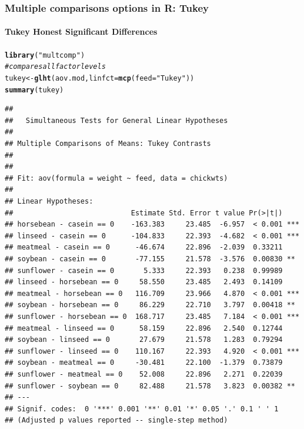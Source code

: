 \documentclass{beamer}\usepackage[]{graphicx}\usepackage[]{color}
\makeatletter
\newcommand{\hlstr}[1]{\textcolor[rgb]{0.192,0.494,0.8}{#1}}%
\newcommand{\hlcom}[1]{\textcolor[rgb]{0.678,0.584,0.686}{\textit{#1}}}%
\newcommand{\hlstd}[1]{\textcolor[rgb]{0.345,0.345,0.345}{#1}}%
\newcommand{\hlkwb}[1]{\textcolor[rgb]{0.69,0.353,0.396}{#1}}%
\newcommand{\hlkwc}[1]{\textcolor[rgb]{0.333,0.667,0.333}{#1}}%
\newcommand{\hlkwd}[1]{\textcolor[rgb]{0.737,0.353,0.396}{\textbf{#1}}}%
\newenvironment{kframe}{%
 \def\at@end@of@kframe{}%
 \ifinner\ifhmode%
  \def\at@end@of@kframe{\end{minipage}}%
  \begin{minipage}{\columnwidth}%
 \fi\fi%
 \def\FrameCommand##1{\hskip\@totalleftmargin \hskip-\fboxsep
 \colorbox{shadecolor}{##1}\hskip-\fboxsep
     \hskip-\linewidth \hskip-\@totalleftmargin \hskip\columnwidth}%
 \MakeFramed {\advance\hsize-\width
   \@totalleftmargin\z@ \linewidth\hsize
   \@setminipage}}%
 {\par\unskip\endMakeFramed%
 \at@end@of@kframe}
\newenvironment{knitrout}{}{} %
\makeatother
\begin{document}
{{{
\begin{frame}[fragile]
\frametitle{Multiple comparisons options in R: Tukey}
\framesubtitle{Tukey Honest Significant Differences}
\begin{knitrout}\tiny
{}\color{fgcolor}\begin{kframe}
\begin{alltt}
\hlkwd{library}\hlstd{(}\hlstr{"multcomp"}\hlstd{)}
\hlcom{# compares all factor levels}
\hlstd{tukey} \hlkwb{<-} \hlkwd{glht}\hlstd{(aov.mod,} \hlkwc{linfct} \hlstd{=} \hlkwd{mcp}\hlstd{(}\hlkwc{feed} \hlstd{=} \hlstr{"Tukey"}\hlstd{))}
\hlkwd{summary}\hlstd{(tukey)}
\end{alltt}
\begin{verbatim}
## 
## 	 Simultaneous Tests for General Linear Hypotheses
## 
## Multiple Comparisons of Means: Tukey Contrasts
## 
## 
## Fit: aov(formula = weight ~ feed, data = chickwts)
## 
## Linear Hypotheses:
##                            Estimate Std. Error t value Pr(>|t|)    
## horsebean - casein == 0    -163.383     23.485  -6.957  < 0.001 ***
## linseed - casein == 0      -104.833     22.393  -4.682  < 0.001 ***
## meatmeal - casein == 0      -46.674     22.896  -2.039  0.33211    
## soybean - casein == 0       -77.155     21.578  -3.576  0.00830 ** 
## sunflower - casein == 0       5.333     22.393   0.238  0.99989    
## linseed - horsebean == 0     58.550     23.485   2.493  0.14109    
## meatmeal - horsebean == 0   116.709     23.966   4.870  < 0.001 ***
## soybean - horsebean == 0     86.229     22.710   3.797  0.00418 ** 
## sunflower - horsebean == 0  168.717     23.485   7.184  < 0.001 ***
## meatmeal - linseed == 0      58.159     22.896   2.540  0.12744    
## soybean - linseed == 0       27.679     21.578   1.283  0.79294    
## sunflower - linseed == 0    110.167     22.393   4.920  < 0.001 ***
## soybean - meatmeal == 0     -30.481     22.100  -1.379  0.73879    
## sunflower - meatmeal == 0    52.008     22.896   2.271  0.22039    
## sunflower - soybean == 0     82.488     21.578   3.823  0.00382 ** 
## ---
## Signif. codes:  0 '***' 0.001 '**' 0.01 '*' 0.05 '.' 0.1 ' ' 1
## (Adjusted p values reported -- single-step method)
\end{verbatim}
\end{kframe}
\end{knitrout}
\end{frame}


}}}
\end{document}
